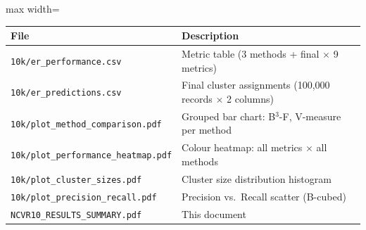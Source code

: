 \documentclass[11pt, a4paper]{article}
\begin{document}
\begin{table}[h!]
\centering
\begin{adjustbox}{max width=\linewidth}
\begin{tabular}{ll}
\toprule
\textbf{File} & \textbf{Description} \\
\midrule
\texttt{10k/er\_performance.csv}          & Metric table (3 methods + final $\times$ 9 metrics) \\
\texttt{10k/er\_predictions.csv}          & Final cluster assignments (100,000 records $\times$ 2 columns) \\
\texttt{10k/plot\_method\_comparison.pdf} & Grouped bar chart: B$^3$-F, V-measure per method \\
\texttt{10k/plot\_performance\_heatmap.pdf} & Colour heatmap: all metrics $\times$ all methods \\
\texttt{10k/plot\_cluster\_sizes.pdf}     & Cluster size distribution histogram \\
\texttt{10k/plot\_precision\_recall.pdf}  & Precision vs.\ Recall scatter (B-cubed) \\
\texttt{NCVR10\_RESULTS\_SUMMARY.pdf}     & This document \\
\bottomrule
\end{tabular}
\end{adjustbox}
\end{table}
\end{document}
